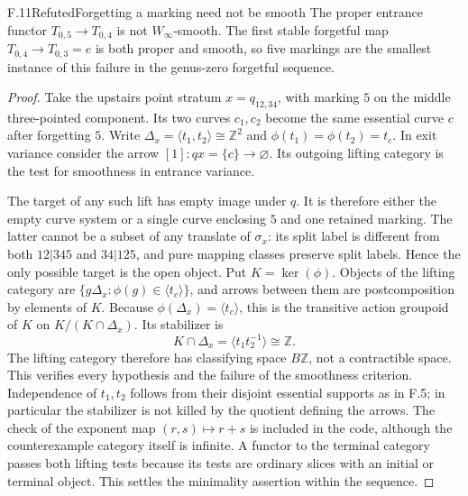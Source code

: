 \begin{statement}{F.11}{Refuted}{Forgetting a marking need not be smooth}
The proper entrance functor $T_{0,5}\to T_{0,4}$ is not
$W_\infty$-smooth.  The first stable forgetful map
$T_{0,4}\to T_{0,3}=e$ is both proper and smooth, so five markings are
the smallest instance of this failure in the genus-zero forgetful
sequence.
\end{statement}
\begin{proof}
Take the upstairs point stratum $x=q_{12,34}$, with marking $5$ on the
middle three-pointed component.  Its two curves $c_1,c_2$ become the
same essential curve $c$ after forgetting $5$.  Write
$\Delta_x=\langle t_1,t_2\rangle\cong\mathbb Z^2$ and
$\phi(t_1)=\phi(t_2)=t_c$.  In exit variance consider the arrow
$[1]:q x=\{c\}\to\varnothing$.  Its outgoing lifting category is the
test for smoothness in entrance variance.

The target of any such lift has empty image under $q$.  It is therefore
either the empty curve system or a single curve enclosing $5$ and one
retained marking.  The latter cannot be a subset of any translate of
$\sigma_x$: its split label is different from both $12|345$ and
$34|125$, and pure mapping classes preserve split labels.  Hence the
only possible target is the open object.  Put
$K=\ker(\phi)$.  Objects of the lifting category are
$\{g\Delta_x:\phi(g)\in\langle t_c\rangle\}$, and arrows between
them are postcomposition by elements of $K$.  Because
$\phi(\Delta_x)=\langle t_c\rangle$, this is the transitive action
groupoid of $K$ on $K/(K\cap\Delta_x)$.  Its stabilizer is
\[
 K\cap\Delta_x=\langle t_1t_2^{-1}\rangle\cong\mathbb Z.
\]
The lifting category therefore has classifying space $B\mathbb Z$,
not a contractible space.  This verifies every hypothesis and the
failure of the smoothness criterion.  Independence of $t_1,t_2$
follows from their disjoint essential supports as in F.5; in particular
the stabilizer is not killed by the quotient defining the arrows.
The check of the exponent map $(r,s)\mapsto r+s$ is included in the
code, although the counterexample category itself is infinite.  A
functor to the terminal category passes both lifting tests because its
tests are ordinary slices with an initial or terminal object.  This
settles the minimality assertion within the sequence.
\end{proof}

